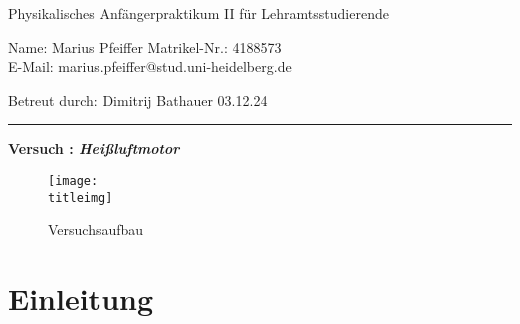\documentclass[a4paper,12pt]{article}
\newcounter{versuchnr}
\begin{document}
	
	\newcommand{\name}{Marius Pfeiffer}

	\setcounter{versuchnr}{222}
	\newcommand{\versuchtitel}{Heißluftmotor}
	\newcommand{\protocolpdf}{files/222messprotokoll.pdf}
	\newcommand{\titleimg}{files/versuchsaufbau.jpg}
	\newcommand{\betreuer}{Dimitrij Bathauer}
	\newcommand{\datum}{03.12.24}
	
	
	\begin{center}
		{Physikalisches Anfängerpraktikum II für Lehramtsstudierende}\\[3mm]
	\end{center}
	
	\vspace*{5mm}
	
	\noindent Name: \name{}
	\hfill Matrikel-Nr.: 4188573\\
	E-Mail: marius.pfeiffer@stud.uni-heidelberg.de
	
	\vspace*{2mm}
	\noindent Betreut durch: \betreuer
    \hfill \datum

	\vspace*{2mm}
	\hrule \vspace*{10mm}

  \begin{center}
    {\bf \large Versuch : \it \bf \versuchtitel}
  \end{center}

  \vspace*{10mm}

  \begin{figure}[H]
    \centering
    \texttt{[image: \\titleimg]}
    \caption{Versuchsaufbau}
  \end{figure}

  \tableofcontents
  \newpage\noindent
	
	\section{Einleitung}
	
	
	
	
  
	
  
	
	\newpage\noindent
	
	
	
	
	\newpage\noindent
	
	
	
\end{document}
